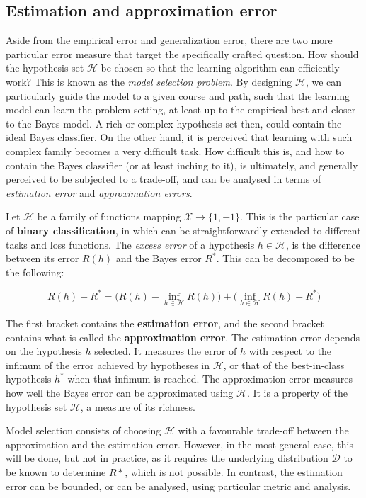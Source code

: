 \subsection{Estimation and approximation error}
Aside from the empirical error and generalization error, there are two more particular error measure that target the specifically crafted question. How should the hypothesis set $\mathcal{H}$ be chosen so that the learning algorithm can efficiently work? This is known as the \textit{model selection problem}. By designing $\mathcal{H}$, we can particularly guide the model to a given course and path, such that the learning model can learn the problem setting, at least up to the empirical best and closer to the Bayes model. A rich or complex hypothesis set then, could contain the ideal Bayes classifier. On the other hand, it is perceived that learning with such complex family becomes a very difficult task. How difficult this is, and how to contain the Bayes classifier (or at least inching to it), is ultimately, and generally perceived to be subjected to a trade-off, and can be analysed in terms of \textit{estimation error} and \textit{approximation errors}. 

Let $\mathcal{H}$ be a family of functions mapping $\mathcal{X}\to\{1,-1\}$. This is the particular case of \textbf{binary classification}, in which can be straightforwardly extended to different tasks and loss functions. The \textit{excess error} of a hypothesis $h\in\mathcal{H}$, is the difference between its error $R(h)$ and the Bayes error $R^{*}$. This can be decomposed to be the following: 

\begin{equation}
    R(h) - R^{*} = \Big( R(h) - \inf_{h\in \mathcal{H}} R(h) \Big) + \Big( \inf_{h\in \mathcal{H}} R(h) - R^{*} \Big)
\end{equation}

The first bracket contains the \textbf{estimation error}, and the second bracket contains what is called the \textbf{approximation error}. The estimation error depends on the hypothesis $h$ selected. It measures the error of $h$ with respect to the infimum of the error achieved by hypotheses in $\mathcal{H}$, or that of the best-in-class hypothesis $h^{*}$ when that infimum is reached. The approximation error measures how well the Bayes error can be approximated using $\mathcal{H}$. It is a property of the hypothesis set $\mathcal{H}$, a measure of its richness. 

Model selection consists of choosing $\mathcal{H}$ with a favourable trade-off between the approximation and the estimation error. However, in the most general case, this will be done, but not in practice, as it requires the underlying distribution $\mathcal{D}$ to be known to determine $R{*}$, which is not possible. In contrast, the estimation error can be bounded, or can be analysed, using particular metric and analysis. 

